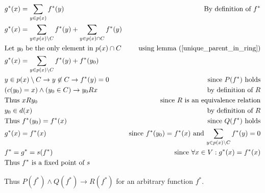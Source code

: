 \documentclass[11pt]{article}
\begin{document}
\begin{align*}
& \text{$g^{*}(x) = \sum_{y \in p(x)} f^{*}(y)$} & \text{By definition of $f^{*}$} \\
& \text{$g^{*}(x) = \sum_{y \in p(x)\setminus C} f^{*}(y) + \sum_{y \in p(x)\cap C} f^{*}(y)$} & \text{} \\
& \text{Let $y_{0}$ be the only element in $p(x)\cap C$} & \text{using lemma (\ref{unique_parent_in_ring})} \\
& \text{$g^{*}(x) = \sum_{y \in p(x)\setminus C} f^{*}(y) + f^{*}(y_{0})$} & \text{} \\
& \text{$y \in p(x)\setminus C \rightarrow y \not \in C \rightarrow f^{*}(y)=0$} & \text{since $P(f^{*})$ holds} \\
& \text{$(c(y_{0})=x) \land (y_{0}\in C) \rightarrow y_{0}Rx$} & \text{by definition of $R$} \\
& \text{Thus $xRy_{0}$} & \text{since $R$ is an equivalence relation} \\
& \text{$y_{0} \in d(x)$} & \text{by definition of $R$} \\
& \text{Thus $f^{*}(y_{0}) = f^{*}(x)$} & \text{since $Q(f^{*})$ holds} \\
& \text{$g^{*}(x) = f^{*}(x)$} & \text{since $f^{*}(y_{0}) = f^{*}(x)$ and $\sum_{y \in p(x)\setminus C} f^{*}(y) = 0$} \\
& \text{$f^{*} = g^{*} = s(f^{*})$} & \text{since $\forall x \in V: g^{*}(x) = f^{*}(x)$} \\
& \text{Thus $f^{*}$ is a fixed point of $s$} & \text{}
\end{align*}

Thus $P(f^{*}) \land Q(f^{*}) \rightarrow R(f^{*})$ for an arbitrary function $f^{*}$.
\end{document}
